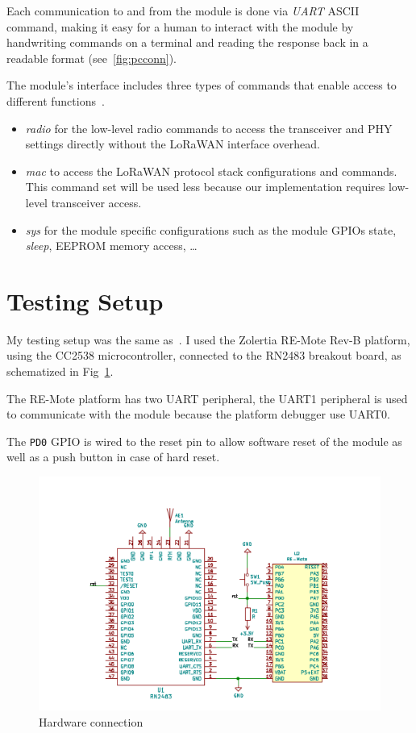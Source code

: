 Each communication to and from the module is done via \emph{UART} ASCII command,
making it easy for a human to interact with the module by handwriting commands
on a terminal and reading the response back in a readable format
(see~\ref{fig:pcconn}).



The module's interface includes three types of commands that enable access to
different functions~\cite{microchip:reference}.

\begin{itemize}
  \item \emph{radio} for the low-level radio commands to access the transceiver
    and PHY settings directly without the LoRaWAN interface overhead.
  \item \emph{mac} to access the LoRaWAN protocol stack configurations and
    commands. This command set will be used less because our implementation
    requires low-level transceiver access.
  \item \emph{sys} for the module specific configurations such as the module
    GPIOs state, \emph{sleep}, EEPROM memory access, \ldots
\end{itemize}

\section{Testing Setup}

My testing setup was the same as~\cite{8847137}. I used the Zolertia RE-Mote
Rev-B platform, using the CC2538 microcontroller, connected to the
RN2483 breakout board, as schematized in Fig~\ref{fig:schemaconn}. 

The RE-Mote platform has two UART peripheral, the UART1 peripheral is used
to communicate with the module because the platform debugger use UART0.

The \lstinline{PD0} GPIO is wired to the reset pin to allow
software reset of the module as well as a push button in case of hard reset.

\begin{figure}[H]
  \centering
  \includegraphics[scale=0.70]{thesis.tex/chapters/driver/fig/conn_diag.pdf}
  \caption{Hardware connection\label{fig:schemaconn}}
\end{figure}

